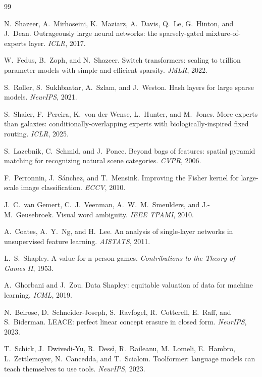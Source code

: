 \documentclass[11pt]{article}
\begin{document}
\begin{thebibliography}{99}\small

    N.~Shazeer, A.~Mirhoseini, K.~Maziarz, A.~Davis, Q.~Le, G.~Hinton,
    and J.~Dean.
    Outrageously large neural networks: the sparsely-gated
    mixture-of-experts layer.
    \emph{ICLR}, 2017.

    W.~Fedus, B.~Zoph, and N.~Shazeer.
    Switch transformers: scaling to trillion parameter models with
    simple and efficient sparsity.
    \emph{JMLR}, 2022.

    S.~Roller, S.~Sukhbaatar, A.~Szlam, and J.~Weston.
    Hash layers for large sparse models.
    \emph{NeurIPS}, 2021.

    S.~Shaier, F.~Pereira, K.~von der Wense, L.~Hunter, and
    M.~Jones.
    More experts than galaxies: conditionally-overlapping experts
    with biologically-inspired fixed routing.
    \emph{ICLR}, 2025.

    S.~Lazebnik, C.~Schmid, and J.~Ponce.
    Beyond bags of features: spatial pyramid matching for recognizing
    natural scene categories.
    \emph{CVPR}, 2006.

    F.~Perronnin, J.~S\'anchez, and T.~Mensink.
    Improving the Fisher kernel for large-scale image classification.
    \emph{ECCV}, 2010.

    J.~C.~van Gemert, C.~J.~Veenman, A.~W.~M.~Smeulders, and
    J.-M.~Geusebroek.
    Visual word ambiguity.
    \emph{IEEE TPAMI}, 2010.

    A.~Coates, A.~Y.~Ng, and H.~Lee.
    An analysis of single-layer networks in unsupervised feature
    learning.
    \emph{AISTATS}, 2011.

    L.~S.~Shapley.
    A value for n-person games.
    \emph{Contributions to the Theory of Games II}, 1953.

    A.~Ghorbani and J.~Zou.
    Data Shapley: equitable valuation of data for machine learning.
    \emph{ICML}, 2019.

    N.~Belrose, D.~Schneider-Joseph, S.~Ravfogel, R.~Cotterell,
    E.~Raff, and S.~Biderman.
    LEACE: perfect linear concept erasure in closed form.
    \emph{NeurIPS}, 2023.

    T.~Schick, J.~Dwivedi-Yu, R.~Dess\`i, R.~Raileanu, M.~Lomeli,
    E.~Hambro, L.~Zettlemoyer, N.~Cancedda, and T.~Scialom.
    Toolformer: language models can teach themselves to use tools.
    \emph{NeurIPS}, 2023.


\end{thebibliography}
\end{document}
